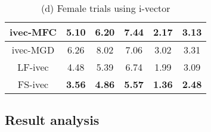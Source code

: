 \documentclass[preprint,12pt,5p]{elsarticle}
\begin{document}
\begin{table*}
\begin{minipage}{.5\linewidth}
{\begin{tabular}{|c|c|c|c|c|c|}
ivec-MFC & 5.10 & 6.20 & 7.44 & 2.17 & 3.13 \\ \hline
ivec-MGD &  6.26 & 8.02 & 7.06 & 3.02 & 3.31  \\ \hline
LF-ivec & 4.48 & 5.39 & 6.74 & 1.99 & 3.09 \\ \hline
FS-ivec & {\bf 3.56} & {\bf 4.86} & {\bf 5.57} & {\bf 1.36} & {\bf 2.48} \\ \hline
\end{tabular}
\label{tab:eer_ivec_male}}
\end{minipage}%
\begin{minipage}{.5\linewidth}
\centering
\caption*{\small (d) Female trials using i-vector}
\label{tab:eer_ivec_female}
\end{minipage}
\label{tab:eer}
\end{table*}

\subsection{Result analysis}
\label{subsec:resAnalysis}


\begin{table}[t!hb]
\centering
\caption{Distribution of the speakers to MFCC and MODGDF optimal feature spaces.}
\label{tab:optFeat}
\end{table}
\end{document}
